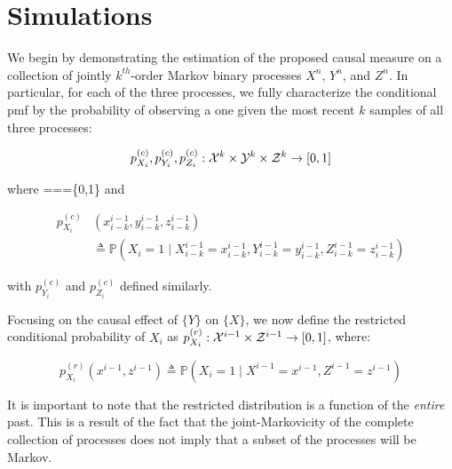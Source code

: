 \section{Simulations} \label{simulations}

\begin{comment}
- Application to conditional bernoulli model using CTW algorithm (Fig 1)
- Explicit derivation of bounds and computation of regret
- Use changing environment meta algorithm for changing parameters to demonstrate that it appears to work even though theorem doesn't apply (Fig 2)
\end{comment}

We begin by demonstrating the estimation of the proposed causal measure on a collection of jointly $k^{th}$-order Markov binary processes $X^n$, $Y^n$, and $Z^n$. In particular, for each of the three processes, we fully characterize the conditional pmf by the probability of observing a one given the most recent $k$ samples of all three processes:

\begin{equation}
p^{(c)}_{X_i},p^{(c)}_{Y_i},p^{(c)}_{Z_i} : \mathcal{X}^k \times \mathcal{Y}^k \times \mathcal{Z}^k \rightarrow [0,1]
\end{equation}

\noindent where ===\{0,1\} and

\begin{equation*}
\begin{aligned}
p^{(c)}_{X_i}&(x_{i-k}^{i-1},y_{i-k}^{i-1},z_{i-k}^{i-1}) \\
&\triangleq \mathbb{P}(X_i = 1 \mid X_{i-k}^{i-1} = x_{i-k}^{i-1},Y_{i-k}^{i-1} = y_{i-k}^{i-1},Z_{i-k}^{i-1} = z_{i-k}^{i-1})
\end{aligned}
\end{equation*}

\noindent with $p^{(c)}_{Y_i}$ and $p^{(c)}_{Z_i}$ defined similarly.

Focusing on the causal effect of $\{Y\}$ on $\{X\}$, we now define the restricted conditional probability of $X_i$ as $p_{X_i}^{(r)}:\mathcal{X}^{i-1} \times \mathcal{Z}^{i-1} \rightarrow [0,1]$, where:

\begin{equation*}
p^{(r)}_{X_i}(x^{i-1},z^{i-1})
\triangleq \mathbb{P}(X_i = 1 \mid X^{i-1} = x^{i-1},Z^{i-1} = z^{i-1})
\end{equation*}

It is important to note that the restricted distribution is a function of the \emph{entire} past. This is a result of the fact that the joint-Markovicity of the complete collection of processes does not imply that a subset of the processes will be Markov.

